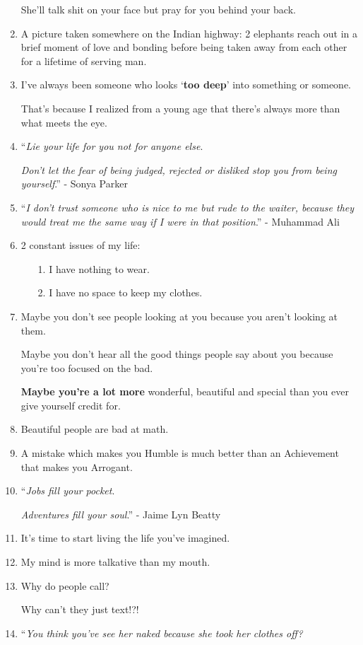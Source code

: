 \documentclass{article}
\begin{document}
\begin{enumerate}
	She'll talk shit on your face but pray for you behind your back.
	\item \textsf{A picture taken somewhere on the Indian highway: 2 elephants reach out in a brief moment of love and bonding before being taken away from each other for a lifetime of serving man.}
	\item I've always been someone who looks `\textbf{too deep}' into something or someone.
	
	That's because I realized from a young age that there's always more than what meets the eye.
	\item ``\textit{Lie your life for you not for anyone else}.
	
	\textit{Don't let the fear of being judged, rejected or disliked stop you from being yourself}.'' - Sonya Parker
	\item ``\textit{I don't trust someone who is nice to me but rude to the waiter, because they would treat me the same way if I were in that position}.'' - Muhammad Ali
	\item 2 constant issues of my life:
	\begin{itemize}
		\item[1.] I have nothing to wear.
		\item[2.] I have no space to keep my clothes.
	\end{itemize}
	\item Maybe you don't see people looking at you because you aren't looking at them.
	
	Maybe you don't hear all the good things people say about you because you're too focused on the bad.
	
	\textbf{Maybe you're a lot more} wonderful, beautiful and special than you ever give yourself credit for.
	\item Beautiful people are bad at math.
	\item A mistake which makes you Humble is much better than an Achievement that makes you Arrogant.
	\item ``\textit{Jobs fill your pocket}.
	
	\textit{Adventures fill your soul}.'' - Jaime Lyn Beatty
	\item It's time to start living the life you've imagined.
	\item My mind is more talkative than my mouth.
	\item Why do people call?
	
	Why can't they just text!?!
	\item ``\textit{You think you've see her naked because she took her clothes off?}
	

\end{enumerate}
\end{document}
